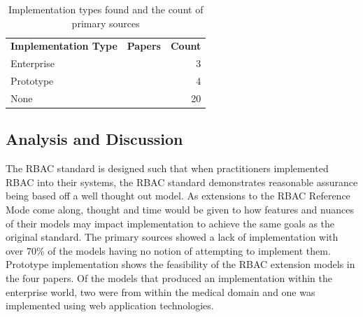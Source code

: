 \begin{table}
\centering
\caption{Implementation types found and the count of primary sources}
\vspace{0.1 in}
\begin{tabular*}{.9\linewidth}{| l | p{.5\linewidth} | r | }
\cline{1-3}

\textbf{Implementation Type} & \textbf{Papers} & \textbf{Count} \\ \cline{1-3}
Enterprise
&
\cite{motta03:contextual}
\cite{aich09:role}
\cite{yao2008task}
&
3 \\ \cline{1-3}
Prototype
& 
\cite{cholewka00:acontext-sensitive}
\cite{huang06:pervasive}
\cite{bao08:role}
\cite{zhou2007team}
&
4 \\ \cline{1-3}
None
&
\cite{alam06:constraint}
\cite{tzelepi01:flexible}
\cite{yamazaki04:designing}
\cite{jian2008extended}
\cite{thein2011leveraging}
\cite{zou2009crbac}
\cite{haibo05:context}
\cite{zhang06:collaborative}
\cite{ni2010privacy}
\cite{masoumzadeh2008purbac}
\cite{damiani2007geo}
\cite{ray2006lrbac}
\cite{hansen2003spatial}
\cite{aich07:STARBAC}
\cite{chen08:spatio-temporal}
\cite{samuel07:spatio-temporal}
\cite{chandran05:llt}
\cite{ray07:spatio}
\cite{oh2003task}
\cite{joshi05:generalized}
&
20 \\

\cline{1-3}
\end{tabular*}
\label{tab:implementations}
\end{table}

\subsection{Analysis and Discussion}

The RBAC standard is designed such that when practitioners implemented RBAC into their systems, the RBAC standard demonstrates reasonable assurance being based off a well thought out model.
As extensions to the RBAC Reference Mode come along, thought and time would be given to how features and nuances of their models may impact implementation to achieve the same goals as the original standard. 
The primary sources showed a lack of implementation
with over 70\% of the models having no notion of attempting to implement them. Prototype implementation shows the feasibility of the RBAC extension models in the four papers. Of the models that produced an implementation within the enterprise world, two were from within the medical domain and one was implemented using web application technologies.  



